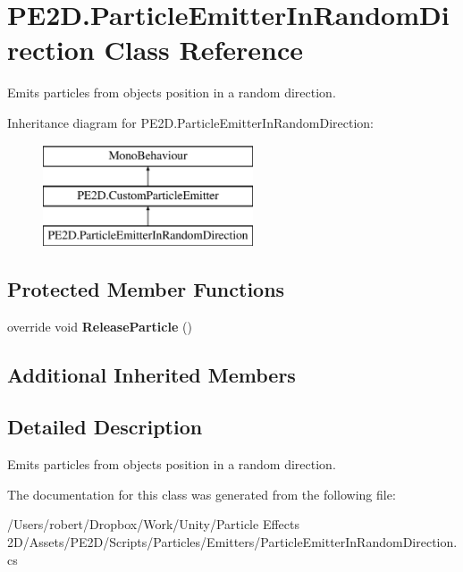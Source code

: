 \hypertarget{class_p_e2_d_1_1_particle_emitter_in_random_direction}{}\section{P\+E2\+D.\+Particle\+Emitter\+In\+Random\+Direction Class Reference}
\label{class_p_e2_d_1_1_particle_emitter_in_random_direction}


Emits particles from objects position in a random direction.  


Inheritance diagram for P\+E2\+D.\+Particle\+Emitter\+In\+Random\+Direction\+:\begin{figure}[H]
\begin{center}
\leavevmode
\includegraphics[height=3.000000cm]{class_p_e2_d_1_1_particle_emitter_in_random_direction}
\end{center}
\end{figure}
\subsection*{Protected Member Functions}
\begin{DoxyCompactItemize}
\item 
\hypertarget{class_p_e2_d_1_1_particle_emitter_in_random_direction_a1a3361f42094f2cf1f47ea4bfac4e4df}{}override void {\bfseries Release\+Particle} ()\label{class_p_e2_d_1_1_particle_emitter_in_random_direction_a1a3361f42094f2cf1f47ea4bfac4e4df}

\end{DoxyCompactItemize}
\subsection*{Additional Inherited Members}


\subsection{Detailed Description}
Emits particles from objects position in a random direction. 



The documentation for this class was generated from the following file\+:\begin{DoxyCompactItemize}
\item 
/\+Users/robert/\+Dropbox/\+Work/\+Unity/\+Particle Effects 2\+D/\+Assets/\+P\+E2\+D/\+Scripts/\+Particles/\+Emitters/Particle\+Emitter\+In\+Random\+Direction.\+cs\end{DoxyCompactItemize}

